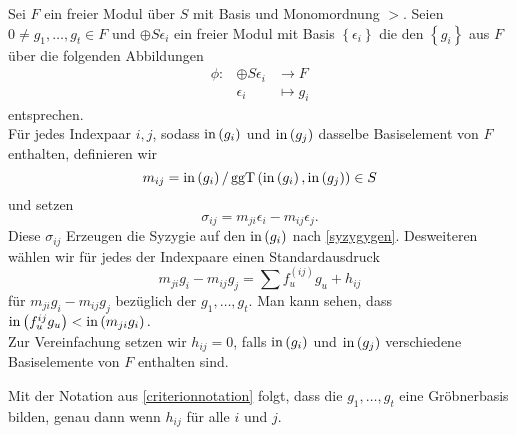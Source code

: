 \documentclass{article}
\begin{document}
\begin{nota}
	Sei
	\( F \)
	ein freier Modul \"uber
	\(S\)
	mit Basis und Monomordnung
	\( > \).
	Seien
	\( 0 \neq g_{1},\dots,g_{t} \in F\)
	und
	\( \oplus S \epsilon_{i} \)
	ein freier Modul mit Basis
	\( \left\{ \epsilon_{i} \right\} \)
	die den
	\( \left\{ g_{i} \right\}\)
	aus
	\( F \)
	\"uber die folgenden Abbildungen
	\begin{align*}
	\phi:& \oplus S \epsilon_{i} & \to F \\
	& \epsilon_{i} & \mapsto g_{i} 
	\end{align*}
	entsprechen. \\
	F\"ur jedes Indexpaar
	\( i, j \),
	sodass
	\( \operatorname{in} \left( g_{i} \right) \)
	und
	\( \operatorname{in} \left( g_{j} \right) \)
	dasselbe Basiselement von
	\( F \)
	enthalten,
	definieren wir
	\[
	m_{ij} 
	= \operatorname{in} \left( g_{i} \right) 
	/ \operatorname{ggT} \left( \operatorname{in}\left( g_{i} \right), 
	\operatorname{in} \left( g_{j} \right) \right) \in S
	\]
	und setzen
	\[
		\sigma_{ij} 
		= m_{ji} \epsilon_{i} 
		- m_{ij} \epsilon_{j} .
	\]
	Diese
	\( \sigma_{ij} \)
	Erzeugen die Syzygie auf den
	\( \operatorname{in} \left( g_{i} \right) \)
	nach \ref{syzygygen}.
		Desweiteren w\"ahlen wir f\"ur jedes der Indexpaare einen Standardausdruck
	\[ 
	m_{ji} g_{i} -m_{ij} g_{j} = \sum f_{u}^{\left( ij \right) } g_{u} + h_{ij}
	\]
	f\"ur
	\(  m_{ji} g_{i} -m_{ij} g_{j} \)
	bez\"uglich der
	\( g_{1},\dots , g_{t} \).
	Man kann sehen,
	dass
	\( \operatorname{in} \left( f_{u}^{ij} g_{u} \right) < \operatorname{in} \left( m_{ji}g_{i} \right). \) \\
	Zur Vereinfachung setzen wir
	\( h_{ij} = 0 \),
	falls
	\( \operatorname{in}\left( g_{i} \right) \)
	und
	\( \operatorname{in}\left( g_{j} \right) \)
	verschiedene Basiselemente von
	\( F \)
	enthalten sind.
\end{nota}
\begin{thm}
	Mit der Notation aus \ref{criterionnotation} folgt,
	dass die 
	\( g_{1},\dots,g_{t} \)
	eine Gr\"obnerbasis bilden,
	genau dann wenn 
	\( h_{ij} \)
	f\"ur alle 
	\( i \)
	und 
	\( j\).
\end{thm}
\end{document}
